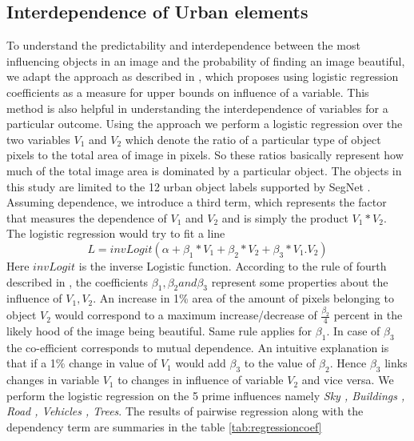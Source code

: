 \subsection{Interdependence of Urban elements}
To understand the predictability and interdependence between the most influencing objects in an image and the probability of finding an image beautiful, we adapt the approach as described in \cite{vaughn2008data},
which proposes using logistic regression coefficients as a measure for upper bounds on influence of a variable. This method is also helpful in understanding the interdependence of variables for a particular outcome. 
Using the approach we perform a logistic regression over the two variables $V_1$ and $V_2$ which denote the ratio of a particular type of object pixels to the total area of image in pixels. So these ratios basically represent how much of the total image area is dominated by a particular object. The objects in this study are limited to the 12 urban object labels supported by SegNet \cite{badrinarayanan2015segnet}.
Assuming dependence, we introduce  a third term, which represents the factor that measures the dependence of $V_1$ and $V_2$ and is simply the product $V_1 * V_2 $.
The logistic regression would try to fit a line 
\begin{equation}
L = invLogit(\alpha + \beta_1 * V_1 + \beta_2 * V_2  + \beta_3 * V_{1}.V_{2} )
\label{eq:regression} 
\end{equation}
Here $invLogit$ is the inverse Logistic function. According to the rule of fourth described in \cite{vaughn2008data} , the coefficients $ \beta_1, \beta_2 and \beta_3 $ represent some properties about the influence of $ V_1, V_2 $. An increase in 1\% area of the amount of pixels belonging to object $ V_2 $ would correspond to a maximum increase/decrease of $\frac{\beta_2}{4}$ percent in the likely hood of the image being beautiful. Same rule applies for $\beta_1$. In case of $\beta_3$ the co-efficient corresponds to mutual dependence. An intuitive explanation is that if a 1\% change in value of $V_1$ would add $\beta_3$ to the value of $\beta_2$. Hence $\beta_3$ links changes in variable $V_1$ to changes in influence of variable $V_2$ and vice versa.
We perform the logistic regression on the 5 prime influences namely \textit{Sky , Buildings , Road , Vehicles , Trees}. The results of pairwise regression along with the dependency term are summaries in the table \ref{tab:regressioncoef}
